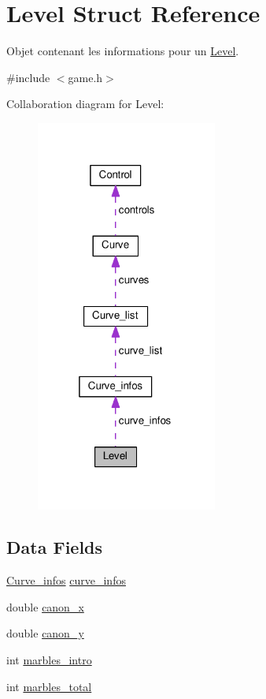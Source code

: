 \hypertarget{struct_level}{}\section{Level Struct Reference}
\label{struct_level}


Objet contenant les informations pour un \hyperlink{struct_level}{Level}.  




{\ttfamily \#include $<$game.\+h$>$}



Collaboration diagram for Level\+:
\nopagebreak
\begin{figure}[H]
\begin{center}
\leavevmode
\includegraphics[width=169pt]{struct_level__coll__graph}
\end{center}
\end{figure}
\subsection*{Data Fields}
\begin{DoxyCompactItemize}
\item 
\hyperlink{struct_curve__infos}{Curve\+\_\+infos} \hyperlink{struct_level_a917c9ea829deeac9d6a1c2309f76595b}{curve\+\_\+infos}
\item 
double \hyperlink{struct_level_a8d69c9e5161432eba15b8c66a3d822dc}{canon\+\_\+x}
\item 
double \hyperlink{struct_level_ae539e37b2953880bd182e39068838d1a}{canon\+\_\+y}
\item 
int \hyperlink{struct_level_a49a2ee16a8bedba06cdd451170c2e5ad}{marbles\+\_\+intro}
\item 
int \hyperlink{struct_level_a96e2ff7aa7e440993d021792df0fcfd3}{marbles\+\_\+total}
\end{DoxyCompactItemize}


